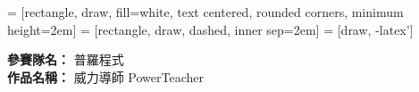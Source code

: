 \documentclass[12pt]{article}
\begin{document}
\date{}
\usetikzlibrary{automata, positioning, arrows, shapes, fit}
{}
 = [rectangle, draw, fill=white, 
    text centered, rounded corners, minimum height=2em]
 = [rectangle, draw, dashed, inner sep=2em]
 = [draw, -latex']

\noindent
\textbf{參賽隊名：} 普羅程式 \\
\textbf{作品名稱：} 威力導師 PowerTeacher \\
\end{document}
